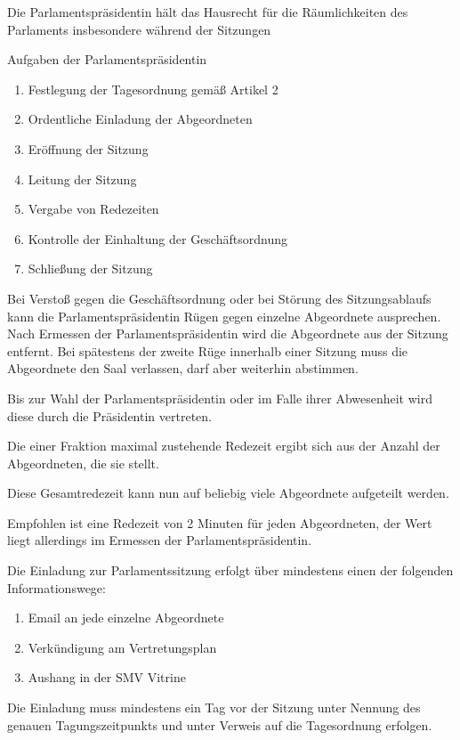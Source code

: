 \documentclass{sasbase}
\begin{document}
\begin{article}[Parlamentspräsidentin]
    \item Die Parlamentspräsidentin hält das Hausrecht für die Räumlichkeiten des Parlaments
        insbesondere während der Sitzungen
    \item Aufgaben der Parlamentspräsidentin
    \begin{enumerate}
        \item Festlegung der Tagesordnung gemäß Artikel 2
        \item Ordentliche Einladung der Abgeordneten
        \item Eröffnung der Sitzung
        \item Leitung der Sitzung
        \item Vergabe von Redezeiten
        \item Kontrolle der Einhaltung der Geschäftsordnung
        \item Schließung der Sitzung
    \end{enumerate}
    \item Bei Verstoß gegen die Geschäftsordnung oder bei Störung des Sitzungsablaufs kann die
        Parlamentspräsidentin Rügen gegen einzelne Abgeordnete ausprechen. Nach Ermessen der Parlamentspr\"{a}sidentin 
        wird die Abgeordnete aus der Sitzung entfernt. Bei spätestens der zweite Rüge
        innerhalb einer Sitzung muss die Abgeordnete den Saal verlassen, darf aber weiterhin abstimmen.
    \item Bis zur Wahl der Parlamentspräsidentin oder im Falle ihrer Abwesenheit wird diese durch
        die Präsidentin vertreten.
\end{article}

\begin{article}[Redezeiten]
    \item Die einer Fraktion maximal zustehende Redezeit ergibt sich aus der Anzahl der Abgeordneten, die sie stellt.
    \item Diese Gesamtredezeit kann nun auf beliebig viele Abgeordnete aufgeteilt werden.
    \item Empfohlen ist eine Redezeit von 2 Minuten f\"{u}r jeden Abgeordneten, der Wert liegt allerdings im Ermessen der Parlamentspr\"{a}sidentin.
\end{article}
    
\begin{article}[Einladung]
    \item Die Einladung zur Parlamentssitzung erfolgt über mindestens einen der folgenden
        Informationswege:
        \begin{enumerate}
            \item Email an jede einzelne Abgeordnete
            \item Verkündigung am Vertretungsplan
            \item Aushang in der SMV Vitrine
        \end{enumerate}
    \item Die Einladung muss mindestens ein Tag vor der Sitzung unter Nennung des genauen
        Tagungszeitpunkts und unter Verweis auf die Tagesordnung erfolgen.
\end{article}
\end{document}

